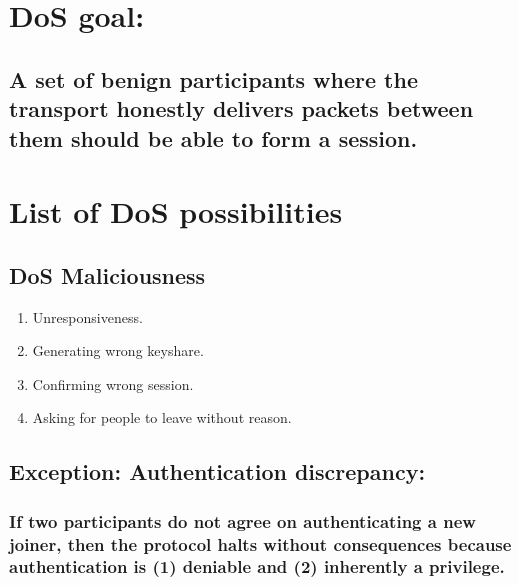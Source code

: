 \documentclass[11pt]{article}
\begin{document}
\section{DoS goal:}
\label{sec-2}
\subsection{A set of benign participants where the transport honestly delivers packets between them should be able to form a session.}
\label{sec-2-1}

\section{List of DoS possibilities}
\label{sec-3}
\subsection{DoS Maliciousness}
\label{sec-3-1}
\begin{enumerate}
\item Unresponsiveness.
\item Generating wrong keyshare.
\item Confirming wrong session.
\item Asking for people to leave without reason.
\end{enumerate}
\subsection{Exception: Authentication discrepancy:}
\label{sec-3-2}
\subsubsection{If two participants do not agree on authenticating a new joiner, then the protocol halts without consequences because authentication is (1) deniable and (2) inherently a privilege.}
\label{sec-3-2-1}
\end{document}
